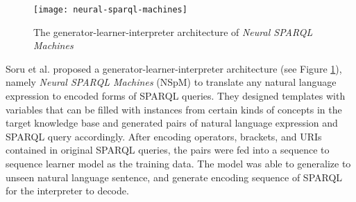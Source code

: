 \begin{figure}[h]
\texttt{[image: neural-sparql-machines]}
\centering
\caption{The generator-learner-interpreter architecture of \textit{Neural SPARQL Machines} \cite{Soru2018a}}
\label{figure:nsm architecture}
\end{figure}

Soru et al. \cite{Soru2018a,Soru2018} proposed a generator-learner-interpreter architecture (see Figure \ref{figure:nsm architecture}), namely \textit{Neural SPARQL Machines} (NSpM) to translate any natural language expression to encoded forms of SPARQL queries. They designed templates with variables that can be filled with instances from certain kinds of concepts in the target knowledge base and generated pairs of natural language expression and SPARQL query accordingly. After encoding operators, brackets, and URIs contained in original SPARQL queries, the pairs were fed into a sequence to sequence learner model as the training data. The model was able to generalize to unseen natural language sentence, and generate encoding sequence of SPARQL for the interpreter to decode. 



